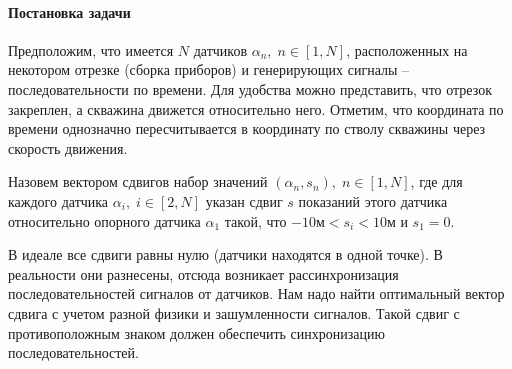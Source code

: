 \paragraph{Постановка задачи}
\par
Предположим, что имеется $N$ датчиков $\alpha_n,\;n\in[1,N]$, расположенных на некотором отрезке (сборка приборов) и генерирующих сигналы – последовательности по времени. Для удобства можно представить, что отрезок закреплен, а скважина движется относительно него. Отметим, что координата по времени однозначно пересчитывается в координату по стволу скважины через скорость движения. 
\par
Назовем вектором сдвигов набор значений $(\alpha_n,s_n),\;n\in[1,N]$, где для каждого датчика $\alpha_i,\;i\in[2,N]$ указан сдвиг $s$ показаний этого датчика относительно опорного датчика $\alpha_1$ такой, что $-10\text{м}<s_i<10\text{м}$ и $s_1=0$.
\par
В идеале все сдвиги равны нулю (датчики находятся в одной точке). В реальности они разнесены, отсюда возникает рассинхронизация последовательностей сигналов от датчиков. Нам надо найти оптимальный вектор сдвига с учетом разной физики и зашумленности сигналов. Такой сдвиг с противоположным знаком должен обеспечить синхронизацию последовательностей.

